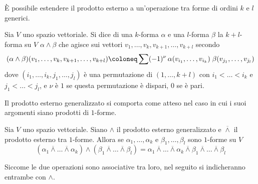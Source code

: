 È possibile estendere il prodotto esterno a un'operazione tra forme di ordini $k$ e $l$ generici.
\begin{definition}
  Sia $V$ uno spazio vettoriale. Si dice  di una $k$-forma $\alpha$ e una $l$-forma $\beta$ la $k+l$-forma su $V$ $\alpha \wedge \beta$ che agisce sui vettori $v_1, \ldots, v_k, v_{k+1}, \ldots, v_{k+l}$ secondo
\begin{equation}
(\alpha \wedge \beta) (v_1, \ldots, v_k, v_{k+1}, \ldots, v_{k+l}) \defeq \sum (-1)^{\nu}\, \alpha(v_{i_1}, \ldots, v_{i_k})\; \beta(v_{j_1}, \ldots, v_{j_l})
\end{equation} 
dove $(i_1, \ldots, i_k, j_1, \ldots, j_l)$ è una permutazione di $(1, \ldots, k+l)$ con $i_1 < \ldots < i_k$ e $j_1 < \ldots < j_l$, e $\nu$ è $1$ se questa permutazione è dispari, $0$ se è pari.
\end{definition}

Il prodotto esterno generalizzato si comporta come atteso nel caso in cui i suoi argomenti siano prodotti di $1$-forme.
\begin{theorem}
  Sia $V$ uno spazio vettoriale. Siano $\wedge$ il prodotto esterno generalizzato e $\overline{\wedge}$ il prodotto esterno tra $1$-forme. Allora se $\alpha_1, \ldots, \alpha_k$ e $\beta_1, \ldots, \beta_l$ sono $1$-forme su $V$ \begin{equation}
  (\alpha_1 \overline{\wedge} \ldots \overline{\wedge} \alpha_k) \wedge (\beta_1 \overline{\wedge} \ldots \overline{\wedge} \beta_l) = \alpha_1 \overline{\wedge} \ldots \overline{\wedge} \alpha_k \overline{\wedge} \beta_1 \overline{\wedge} \ldots \overline{\wedge} \beta_l
  \end{equation} 
\end{theorem}
\begin{remark}
  Siccome le due operazioni sono associative tra loro, nel seguito si indicheranno entrambe con $\wedge$.
\end{remark}


